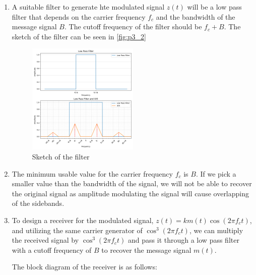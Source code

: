 \documentclass{article}
\begin{document}
\begin{enumerate}[label=3.\arabic*]
    \item A suitable filter to generate hte modulated signal $z(t)$ will be a low pass filter that depends on the carrier frequency $f_c$ and the bandwidth of the message signal $B$. The cutoff frequency of the filter should be $f_c + B$. The sketch of the filter can be seen in \autoref{fig:p3_2}
    \begin{figure}
        \centering
        \includegraphics[width=0.5\textwidth]{p3_2.png}
        \caption{Sketch of the filter}
        \label{fig:p3_2}
    \end{figure}

    \item The minimum usable value for the carrier frequency $f_c$ is $B$. If we pick a smaller value than the bandwidth of the signal, we will not be able to recover the original signal as amplitude modulating the signal will cause overlapping of the sidebands.

    \item To design a receiver for the modulated signal, $z(t) = k m(t) \cos(2\pi f_c t)$, and utilizing the same carrier generator of $\cos^3(2\pi f_c t)$, we can multiply the received signal by $\cos^3(2\pi f_c t)$ and pass it through a low pass filter with a cutoff frequency of $B$ to recover the message signal $m(t)$.
    
    The block diagram of the receiver is as follows:
    \begin{center}
\end{center}
\end{enumerate}
\end{document}
